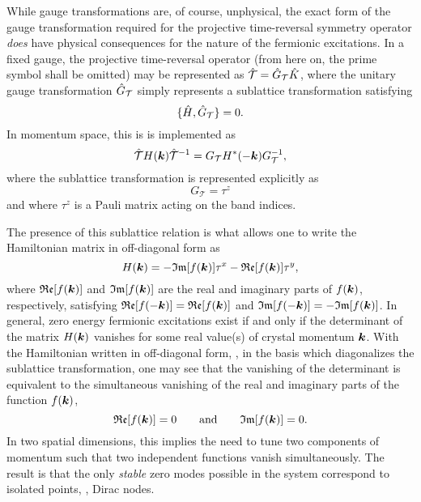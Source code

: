 While gauge transformations are, of course, unphysical, the exact form of the gauge transformation required for the projective time-reversal symmetry operator \textit{does} have physical consequences for the nature of the fermionic excitations.
In a fixed gauge, the projective time-reversal operator (from here on, the prime symbol shall be omitted) may be represented as $\hat{\mathcal{T}} = \hat{G}_{\mathcal{T}} \hat{K}$, where the unitary gauge transformation $\hat{G}_{\mathcal{T}}$ simply represents a sublattice transformation satisfying
%
\begin{equation}
	\{\hat{H}, \hat{G}_\mathcal{T}\} = 0.
\end{equation}
%
In momentum space, this is is implemented as
%
\begin{equation}
	\hat{\mathcal{T}} H(\bm{k}) \hat{\mathcal{T}}^{-1} = G_\mathcal{T} H^*(-\bm{k}) G_\mathcal{T}^{-1},
\end{equation}
%
where the sublattice transformation is represented explicitly as
%
\begin{equation}
	G_\mathcal{T} = \tau^z
\end{equation}
%
and where $\tau^z$ is a Pauli matrix acting on the band indices.

The presence of this sublattice relation is what allows one to write the Hamiltonian matrix in off-diagonal form as
%
\begin{equation}
	H(\bm{k}) = -\mathfrak{Im}[f(\bm{k})] \tau^x - \mathfrak{Re}[f(\bm{k})] \tau^y,
\end{equation}
%
where $\mathfrak{Re}[f(\bm{k})]$ and $\mathfrak{Im}[f(\bm{k})]$ are the real and imaginary parts of $f(\bm{k})$, respectively, satisfying $\mathfrak{Re}[f(-\bm{k})] = \mathfrak{Re}[f(\bm{k})]$ and $\mathfrak{Im}[f(-\bm{k})] = -\mathfrak{Im}[f(\bm{k})]$.
In general, zero energy fermionic excitations exist if and only if the determinant of the matrix $H(\bm{k})$ vanishes for some real value(s) of crystal momentum $\bm{k}$.
With the Hamiltonian written in off-diagonal form, \ie, in the basis which diagonalizes the sublattice transformation, one may see that the vanishing of the determinant is equivalent to the simultaneous vanishing of the real and imaginary parts of the function $f(\bm{k})$,
%
\begin{equation}
	\mathfrak{Re}[f(\bm{k})] = 0 \qquad\text{and}\qquad \mathfrak{Im}[f(\bm{k})] = 0.
	\label{eq:chapter02_DetHEqualsZero}
\end{equation}
%
In two spatial dimensions, this implies the need to tune two components of momentum such that two independent functions vanish simultaneously.
The result is that the only \textit{stable} zero modes possible in the system correspond to isolated points, \ie, Dirac nodes.

